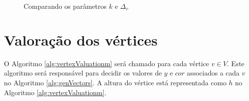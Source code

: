 \begin{figure}[H]
     \centering
     \hspace{0.1cm}
     \hspace{0.1cm}
     \caption{Comparando os parâmetros $k$ e $\Delta_{v}$}
     \label{fig:parametrosGrid}
\end{figure}

\section{Valoração dos vértices}

O Algoritmo \ref{alg:vertexValuationm} será chamado para cada vértice $v \in V$. 
Este algoritmo será responsável para decidir os valores de $y$ e $cor$ associados
a cada $v$ no Algoritmo \ref{alg:genVectors}. A altura do vértice está representada
como $h$ no Algoritmo \ref{alg:vertexValuationm}.

